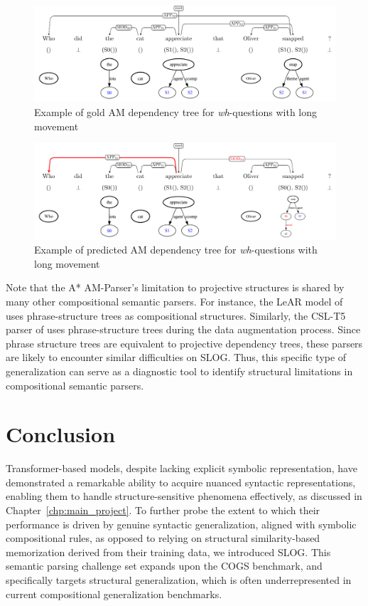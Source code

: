 \begin{figure}[ht]
    \centering
    \includegraphics[scale=0.85]{figures/am_deptree_Q_long_mv.pdf}
    \caption{Example of gold AM dependency tree for \textit{wh}-questions with long movement}
    \label{fig:gold_Q_long_mv}
\end{figure} 

\begin{figure}[ht]
    \centering
    \includegraphics[scale=0.85]{figures/am_deptree_Q_long_mv_error.pdf}
    \caption{Example of predicted AM dependency tree for \textit{wh}-questions with long movement}
    \label{fig:predicted_Q_long_mv}
\end{figure} 


Note that the A* AM-Parser's limitation to projective structures is shared by many other compositional semantic parsers. For instance, the LeAR model of \citet{liu-etal-2021-learning-algebraic} uses phrase-structure trees as compositional structures. Similarly, the CSL-T5 parser of 
\citet{qiu-etal-2022-improving} uses phrase-structure trees during the data augmentation process. Since phrase structure trees are equivalent to projective dependency trees, these parsers are likely to encounter similar difficulties on SLOG.
Thus, this specific type of generalization can serve as a diagnostic tool to identify structural limitations in compositional semantic parsers.

\clearpage
\section{Conclusion} \label{sec:slog_conclu} 

Transformer-based models, despite lacking explicit symbolic representation, have demonstrated a remarkable ability to acquire nuanced syntactic representations, enabling them to handle structure-sensitive phenomena effectively, as discussed in Chapter~\ref{chp:main_project}. To further probe the extent to which their performance is driven by genuine syntactic generalization, aligned with symbolic compositional rules, as opposed to relying on structural similarity-based memorization derived from their training data, we introduced SLOG. This semantic parsing challenge set expands upon the COGS benchmark, and specifically targets structural generalization, which is often underrepresented in current compositional generalization benchmarks. 

